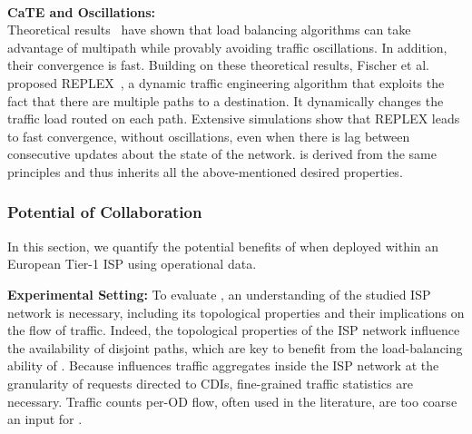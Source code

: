 \ \\\noindent\textbf{CaTE and Oscillations:}\label{sec:CaTE-Oscilations}\\\noindent
Theoretical results~\cite{AdaptiveRouting2005,Convergence:Fischer2006} have shown that
load balancing algorithms can take advantage of multipath while provably avoiding traffic
oscillations. In addition, their convergence is fast. Building on these theoretical results, Fischer
et al. proposed REPLEX~\cite{Replex}, a dynamic traffic engineering algorithm that exploits
the fact that there are multiple paths to a destination. It dynamically changes the traffic load
routed on each path. Extensive simulations show that REPLEX leads to fast convergence, without
oscillations, even when there is lag between consecutive updates about the state of the network.
\cate is derived from the same principles and thus inherits all the above-mentioned desired properties.



\subsubsection{Potential of Collaboration}\label{sec:impact}

In this section, we quantify the potential benefits of \cate when deployed
within an European Tier-1 ISP using operational data.

\noindent\textbf{Experimental Setting:}\label{sec:Experimental-Setting}
To evaluate \cate, an understanding of the studied ISP network is necessary,
including its topological properties and their implications on the flow of
traffic.  Indeed, the topological properties of the ISP network influence the
availability of disjoint paths, which are key to benefit from the
load-balancing ability of \cate.  Because \cate influences traffic aggregates
inside the ISP network at the granularity of requests directed to CDIs,
fine-grained traffic statistics are necessary.  Traffic counts per-OD flow,
often used in the literature, are too coarse an input for \cate.

